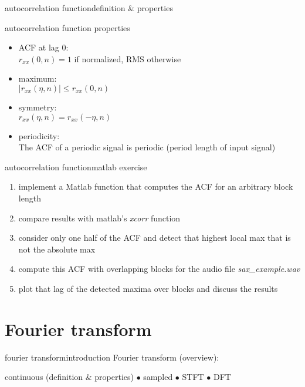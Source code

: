         \begin{frame}{autocorrelation function}{definition \& properties}
            \begin{block}{autocorrelation function properties}
                \begin{itemize}
                    \item	{ACF} at lag $0$:\\
                    $r_{xx}(0,n) = 1$ if normalized, RMS otherwise
                
                    \item	maximum:\\
                    $|r_{xx}(\eta,n)| \leq r_{xx}(0,n)$ 
                    \item	symmetry:\\
                    $r_{xx}(\eta,n) = r_{xx}(-\eta,n)$
                    \item	periodicity:\\
                    The {ACF} of a periodic signal is periodic (period length of input signal)
                \end{itemize}	
            \end{block}
        \end{frame}	
        
        \begin{frame}{autocorrelation function}{matlab exercise}
            
            \begin{enumerate}
                \item   implement a Matlab function that computes the ACF for an arbitrary block length
                \item   compare results with matlab's \textsl{xcorr} function
                \item   consider only one half of the ACF and detect that highest local max that is not the absolute max
                \item   compute this ACF with overlapping blocks for the audio file \textsl{sax\_example.wav} 
                \item   plot that lag of the detected maxima over blocks and discuss the results
            \end{enumerate}
        \end{frame}
 
    \section{Fourier transform}
        \begin{frame}{fourier transform}{introduction}
            Fourier transform (overview):
            
            continuous (definition \& properties) $\bullet$ sampled $\bullet$ STFT $\bullet$ DFT
            \vspace{30mm}
        \end{frame}	

